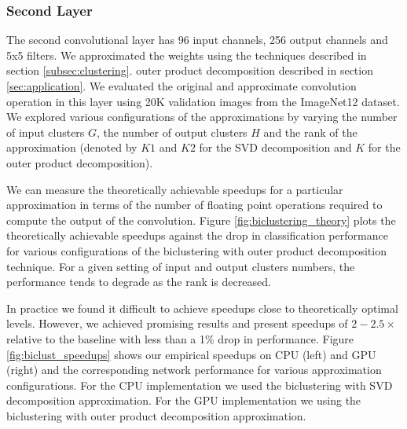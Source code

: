 \subsubsection{Second Layer}
The second convolutional layer has 96 input channels, 256 output channels and 5x5 filters. 
We approximated the weights using the techniques described in section \ref{subsec:clustering}. 
outer product decomposition described in section \ref{sec:application}.
We evaluated the original and approximate convolution operation in
this layer using 20K validation images from the ImageNet12 dataset. 
We explored various configurations of the approximations by varying the number of input clusters $G$, the number of output clusters $H$ and the rank of the approximation (denoted by $K1$ and $K2$ for the SVD decomposition and $K$ for the outer product decomposition). 

We can measure the theoretically achievable speedups for a particular approximation in terms of the number of floating point operations required to compute the output of the convolution. 
Figure \ref{fig:biclustering_theory} plots the theoretically achievable speedups against the drop in classification performance for various configurations of the biclustering with outer product decomposition technique.  
For a given setting of input and output clusters numbers, the performance tends to degrade as the rank is decreased. 

In practice we found it difficult to achieve speedups close to theoretically optimal levels. 
However, we achieved promising results and present speedups of $2-2.5\times$ relative to the baseline with less than a 1\% drop in performance.
Figure \ref{fig:biclust_speedups} shows our empirical speedups on CPU
(left) and GPU (right) and the corresponding network performance for
various approximation configurations. For the CPU implementation we used the biclustering with SVD decomposition approximation. For the GPU implementation we using the biclustering with outer product decomposition approximation.  


